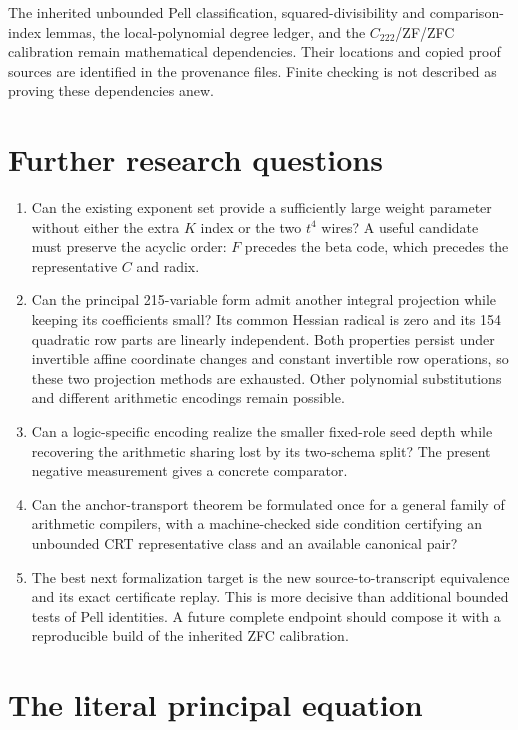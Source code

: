 \documentclass[11pt]{article}
\theoremstyle{definition}\newtheorem{remark}[theorem]{Remark}
\begin{document}
The inherited unbounded Pell classification, squared-divisibility and
comparison-index lemmas, the local-polynomial degree ledger, and the
$C_{222}$/ZF/ZFC calibration remain mathematical dependencies. Their
locations and copied proof sources are identified in the provenance files.
Finite checking is not described as proving these dependencies anew.

\section{Further research questions}

\begin{enumerate}
\item Can the existing exponent set provide a sufficiently large weight
      parameter without either the extra $K$ index or the two $t^4$ wires?
      A useful candidate must preserve the acyclic order: $F$ precedes
      the beta code, which precedes the representative $C$ and radix.
\item Can the principal 215-variable form admit another integral projection
      while keeping its coefficients small? Its common Hessian radical is
      zero and its 154 quadratic row parts are linearly independent.
      Both properties persist under invertible affine coordinate changes
      and constant invertible row operations, so these two projection
      methods are exhausted. Other polynomial substitutions and different
      arithmetic encodings remain possible.
\item Can a logic-specific encoding realize the smaller fixed-role seed
      depth while recovering the arithmetic sharing lost by its two-schema
      split? The present negative measurement gives a concrete comparator.
\item Can the anchor-transport theorem be formulated once for a general
      family of arithmetic compilers, with a machine-checked side condition
      certifying an unbounded CRT representative class and an available
      canonical pair?
\item The best next formalization target is the new source-to-transcript
      equivalence and its exact certificate replay. This is more decisive
      than additional bounded tests of Pell identities. A future complete
      endpoint should compose it with a reproducible build of the inherited
      ZFC calibration.
\end{enumerate}

\appendix
\section{The literal principal equation}\label{app:literal}
\end{document}
